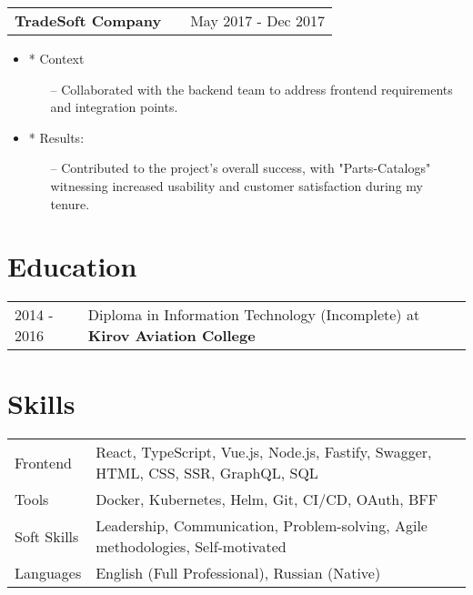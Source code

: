 \documentclass[a4paper,12pt]{article}
\makeatletter
\newenvironment{joblong}[2]
    {
    \begin{tabularx}{\linewidth}{@{}l X r@{}}
    \textbf{#1} & \hfill &  #2 \\[3.75pt]
    \end{tabularx}
    \begin{minipage}[t]{\linewidth}
    \begin{itemize}[nosep,after=\strut, leftmargin=1em, itemsep=3pt,label=--]
    }
    {
    \end{itemize}
    \end{minipage}    
    }
\makeatother
\begin{document}
\begin{joblong}{TradeSoft Company}{May 2017 - Dec 2017}
  \item[*] Context
    \begin{itemize}
      \item [--] Collaborated with the backend team to address frontend requirements and integration points.
    \end{itemize}
  \item [*] Results:
    \begin{itemize}
      \item [--] Contributed to the project's overall success, with "Parts-Catalogs" witnessing increased usability and customer satisfaction during my tenure.
    \end{itemize}
\end{joblong}

\section{Education}
\begin{tabularx}{\linewidth}{@{}l X@{}}	
2014 - 2016 & Diploma in Information Technology (Incomplete) at \textbf{Kirov Aviation College} \hfill \normalsize  \\
\end{tabularx}

\section{Skills}
\begin{tabularx}{\linewidth}{@{}l X@{}}
Frontend &  \normalsize{React, TypeScript, Vue.js, Node.js, Fastify, Swagger, HTML, CSS, SSR, GraphQL, SQL}\\
Tools  &  \normalsize{Docker, Kubernetes, Helm, Git, CI/CD, OAuth, BFF}\\  
Soft Skills  &  \normalsize{Leadership, Communication, Problem-solving, Agile methodologies, Self-motivated}\\  
Languages & \normalsize{English (Full Professional), Russian (Native)}\\  
\end{tabularx}

\vfill
{}
\end{document}
